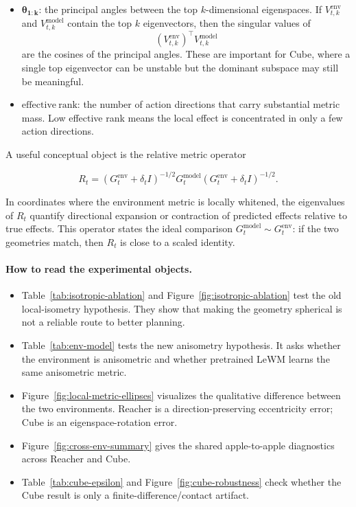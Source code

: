 ﻿\documentclass{article}
\begin{document}
\begin{itemize}
  \item \(\boldsymbol{\theta_{1:k}}\): the principal angles between the top
  \(k\)-dimensional eigenspaces.  If
  \(V^{\mathrm{env}}_{t,k}\) and \(V^{\mathrm{model}}_{t,k}\) contain the top
  \(k\) eigenvectors, then the singular values of
  \[
  \left(V^{\mathrm{env}}_{t,k}\right)^\top V^{\mathrm{model}}_{t,k}
  \]
  are the cosines of the principal angles.  These are important for Cube,
  where a single top eigenvector can be unstable but the dominant subspace may
  still be meaningful.
  \item \(\boldsymbol{\mathrm{effective\ rank}}\): the number of action
  directions that carry substantial metric mass.  Low effective rank means the
  local effect is concentrated in only a few action directions.
\end{itemize}

A useful conceptual object is the relative metric operator

\[
R_t
=
\left(G^{\mathrm{env}}_t+\delta_t I\right)^{-1/2}
G^{\mathrm{model}}_t
\left(G^{\mathrm{env}}_t+\delta_t I\right)^{-1/2}.
\]

In coordinates where the environment metric is locally whitened, the
eigenvalues of \(R_t\) quantify directional expansion or contraction of
predicted effects relative to true effects.  This operator states the ideal
comparison \(G^{\mathrm{model}}_t\sim G^{\mathrm{env}}_t\): if the two
geometries match, then \(R_t\) is close to a scaled identity.

\paragraph{How to read the experimental objects.}
\begin{itemize}
  \item Table~\ref{tab:isotropic-ablation} and
  Figure~\ref{fig:isotropic-ablation} test the old local-isometry hypothesis.
  They show that making the geometry spherical is not a reliable route to
  better planning.
  \item Table~\ref{tab:env-model} tests the new anisometry hypothesis.  It
  asks whether the environment is anisometric and whether pretrained LeWM
  learns the same anisometric metric.
  \item Figure~\ref{fig:local-metric-ellipses} visualizes the qualitative
  difference between the two environments.  Reacher is a direction-preserving
  eccentricity error; Cube is an eigenspace-rotation error.
  \item Figure~\ref{fig:cross-env-summary} gives the shared apple-to-apple
  diagnostics across Reacher and Cube.
  \item Table~\ref{tab:cube-epsilon} and Figure~\ref{fig:cube-robustness}
  check whether the Cube result is only a finite-difference/contact artifact.
\end{itemize}
\end{document}
